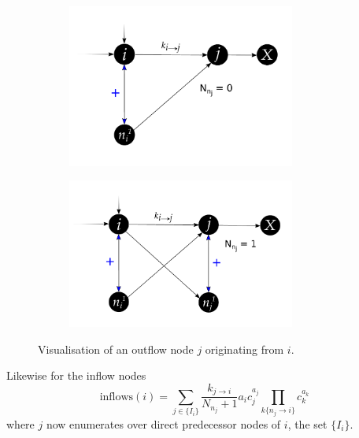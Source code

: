 \documentclass[9.5pt]{article}
\begin{document}
 \begin{figure}[h!]
	\vspace{0.2cm}
	\begin{subfigure}{.5\textwidth}
		\centering
		\includegraphics[width=7.5cm]{figureX4}
		\label{fig::X4}
	\end{subfigure}%
	\vline
	\begin{subfigure}{.5\textwidth}
		\centering
		\includegraphics[width=7.5cm]{figureX3}
		\label{fig::X3}
	\end{subfigure}
	\caption{Visualisation of an outflow node $j$ originating from $i$.}
	\label{fig:outflows}
	\vspace{0.2cm}
\end{figure}

Likewise for the inflow nodes
\begin{equation}
\text{inflows}(i) = \sum_{j \in \{I_i\}} \frac{k_{j\rightarrow i}}{N_{n_j} + 1} a_i c_j^{a_j} \prod_{k \{n_j\rightarrow i\}} c_k^{a_k}
\end{equation}
where $j$ now enumerates over direct predecessor nodes of $i$, the set $\{I_i\}$. 
\end{document}
